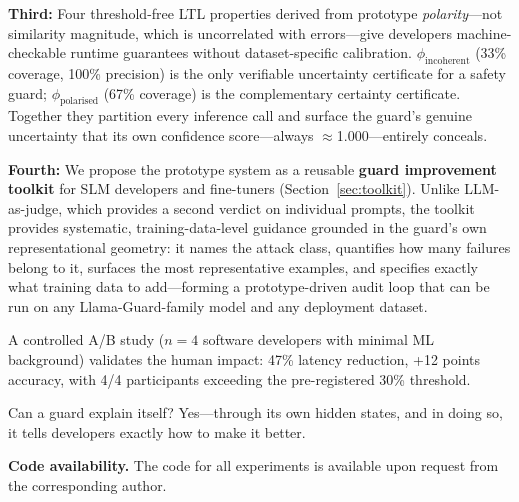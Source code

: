\documentclass[letterpaper]{article}
\begin{document}
\textbf{Third:} Four threshold-free LTL properties derived from prototype \emph{polarity}---not
similarity magnitude, which is uncorrelated with errors---give developers machine-checkable
runtime guarantees without dataset-specific calibration. $\phi_\text{incoherent}$ (33\%
coverage, 100\% precision) is the only verifiable uncertainty certificate for a safety
guard; $\phi_\text{polarised}$ (67\% coverage) is the complementary certainty certificate.
Together they partition every inference call and surface the guard's genuine uncertainty
that its own confidence score---always $\approx$1.000---entirely conceals.

\textbf{Fourth:} We propose the prototype system as a reusable \textbf{guard improvement
toolkit} for SLM developers and fine-tuners (Section~\ref{sec:toolkit}). Unlike
LLM-as-judge, which provides a second verdict on individual prompts, the toolkit
provides systematic, training-data-level guidance grounded in the guard's own
representational geometry: it names the attack class, quantifies how many failures
belong to it, surfaces the most representative examples, and specifies exactly what
training data to add---forming a prototype-driven audit loop that can be run on any
Llama-Guard-family model and any deployment dataset.

A controlled A/B study ($n{=}4$ software developers with minimal ML background) validates the human impact: 47\% latency reduction,
+12 points accuracy, with 4/4 participants exceeding the pre-registered 30\% threshold.

Can a guard explain itself? Yes---through its own hidden states, and in doing so,
it tells developers exactly how to make it better.




\medskip
\noindent\textbf{Code availability.} The code for all experiments is available upon
request from the corresponding author.


\end{document}
